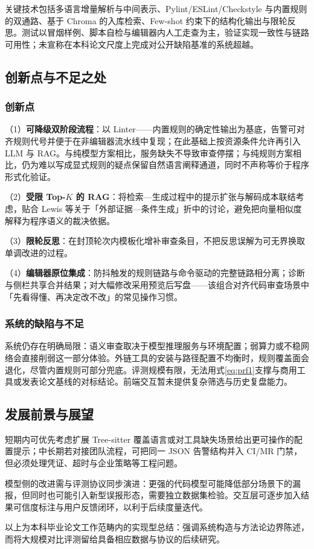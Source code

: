 关键技术包括多语言增量解析与中间表示、Pylint/ESLint/Checkstyle 与内置规则的双通路、基于 Chroma 的入库检索、Few-shot 约束下的结构化输出与限轮反思\cite{chroma2026docs,allminilm2026hf,reimers2019sentencebert,hou2024llmse}。测试以冒烟样例、脚本自检与编辑器内人工走查为主，验证实现一致性与链路可用性；未宣称在本科论文尺度上完成对公开缺陷基准的系统超越。

\subsection{创新点与不足之处}
\subsubsection{创新点}

（1）\textbf{可降级双阶段流程}：以 Linter——内置规则的确定性输出为基底，告警可对齐规则代号并便于在非编辑器流水线中复现；在此基础上按资源条件允许再引入 LLM 与 RAG\cite{sadowski2018scaling,hou2024llmse,lewis2020retrieval}。与纯模型方案相比，服务缺失不导致审查停摆；与纯规则方案相比，仍为难以写成显式规则的疑点保留自然语言阐释通道，同时不声称等价于程序形式化验证。

（2）\textbf{受限 Top-$K$ 的 RAG}：将检索—生成过程中的提示扩张与解码成本联结考虑，贴合 Lewis 等关于「外部证据—条件生成」折中的讨论\cite{lewis2020retrieval}，避免把向量相似度解释为程序语义的裁决依据。

（3）\textbf{限轮反思}：在封顶轮次内模板化增补审查条目，不把反思误解为可无界换取单调改进的过程\cite{hou2024llmse}。

（4）\textbf{编辑器原位集成}：防抖触发的规则链路与命令驱动的完整链路相分离；诊断与侧栏共享合并结果；对大幅修改采用预览后写盘——该组合对齐代码审查场景中「先看得懂、再决定改不改」的常见操作习惯\cite{microsoft2025vscodeapi}。
\subsubsection{系统的缺陷与不足}
系统仍存在明确局限：语义审查取决于模型推理服务与环境配置；弱算力或不稳网络会直接削弱这一部分体验。外链工具的安装与路径配置不均衡时，规则覆盖面会退化，尽管内置规则可部分兜底。评测规模有限，无法用式\eqref{eq:prf1}支撑与商用工具或发表论文基线的对标结论。前端交互暂未提供复杂筛选与历史复盘能力。

\subsection{发展前景与展望}
短期内可优先考虑扩展 Tree-sitter 覆盖语言或对工具缺失场景给出更可操作的配置提示；中长期若对接团队流程，可把同一 JSON 告警结构并入 CI/MR 门禁，但必须处理凭证、超时与企业策略等工程问题。

模型侧的改进需与评测协议同步演进：更强的代码模型可能降低部分场景下的漏报，但同时也可能引入新型误报形态，需要独立数据集检验。交互层可逐步加入结果可信度标注与用户反馈闭环，以利于后续度量迭代。

以上为本科毕业论文工作范畴内的实现型总结：强调系统构造与方法论边界陈述，而将大规模对比评测留给具备相应数据与协议的后续研究。

\newpage
